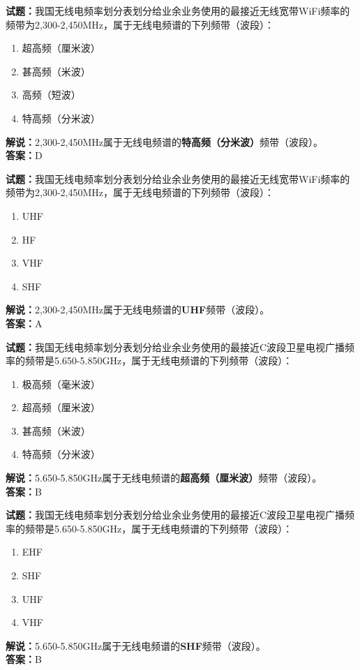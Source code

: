 \documentclass{ctexbook}
\begin{document}
\bigskip


\noindent\textbf{试题：}我国无线电频率划分表划分给业余业务使用的最接近无线宽带WiFi频率的频带为2,300-2,450\unit{\MHz}，属于无线电频谱的下列频带（波段）：
\begin{enumerate}[leftmargin=3em]
\item 超高频（厘米波）
\item 甚高频（米波）
\item 高频（短波）
\item 特高频（分米波）
\end{enumerate}
\noindent\textbf{解说：}2,300-2,450\unit{\MHz}属于无线电频谱的\textbf{特高频（分米波）}频带（波段）。\\\noindent\textbf{答案：}D


\bigskip


\noindent\textbf{试题：}我国无线电频率划分表划分给业余业务使用的最接近无线宽带WiFi频率的频带为2,300-2,450\unit{\MHz}，属于无线电频谱的下列频带（波段）：
\begin{enumerate}[leftmargin=3em]
\item UHF
\item HF
\item VHF
\item SHF
\end{enumerate}
\noindent\textbf{解说：}2,300-2,450\unit{\MHz}属于无线电频谱的\textbf{UHF}频带（波段）。\\\noindent\textbf{答案：}A


\bigskip


\noindent\textbf{试题：}我国无线电频率划分表划分给业余业务使用的最接近C波段卫星电视广播频率的频带是5.650-5.850\unit{\GHz}，属于无线电频谱的下列频带（波段）：
\begin{enumerate}[leftmargin=3em]
\item 极高频（毫米波）
\item 超高频（厘米波）
\item 甚高频（米波）
\item 特高频（分米波）
\end{enumerate}
\noindent\textbf{解说：}5.650-5.850\unit{\GHz}属于无线电频谱的\textbf{超高频（厘米波）}频带（波段）。\\\noindent\textbf{答案：}B


\bigskip


\noindent\textbf{试题：}我国无线电频率划分表划分给业余业务使用的最接近C波段卫星电视广播频率的频带是5.650-5.850\unit{\GHz}，属于无线电频谱的下列频带（波段）：
\begin{enumerate}[leftmargin=3em]
\item EHF
\item SHF
\item UHF
\item VHF
\end{enumerate}
\noindent\textbf{解说：}5.650-5.850\unit{\GHz}属于无线电频谱的\textbf{SHF}频带（波段）。\\\noindent\textbf{答案：}B
\end{document}
